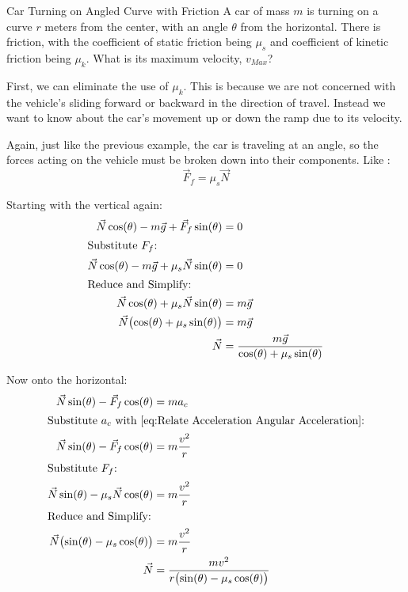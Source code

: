 \begin{example}[]{Car Turning on Angled Curve with Friction}
  A car of mass $m$ is turning on a curve $r$ meters from the center, with an angle $\theta$ from the horizontal.
  There is friction, with the coefficient of static friction being $\mu_{s}$ and coefficient of kinetic friction being $\mu_{k}$.
  What is its maximum velocity, $v_{Max}$?
  \tcblower{}

  First, we can eliminate the use of $\mu_{k}$.
  This is because we are not concerned with the vehicle's sliding forward or backward in the direction of travel.
  Instead we want to know about the car's movement up or down the ramp due to its velocity.

  Again, just like the previous example, the car is traveling at an angle, so the forces acting on the vehicle must be broken down into their components.
  Like :
  \begin{equation*}
    \vec{F}_{f} = \mu_{s} \vec{N}
  \end{equation*}

  Starting with the vertical again:
  \begin{align*}
    \vec{N} \cos(\theta) - m\vec{g} + \vec{F}_{f} \sin(\theta) &= 0 \\
    \shortintertext{Substitute $F_{f}$:}
    \vec{N} \cos(\theta) - m\vec{g} + \mu_{s} \vec{N} \sin(\theta) &= 0 \\
    \shortintertext{Reduce and Simplify:}
    \vec{N} \cos(\theta) + \mu_{s} \vec{N} \sin(\theta) &= m \vec{g} \\
    \vec{N} \bigl( \cos(\theta) + \mu_{s} \sin(\theta) \bigr) &= m \vec{g} \\
    \vec{N} &= \frac{m \vec{g}}{\cos(\theta) + \mu_{s} \sin(\theta)} \\
  \end{align*}

  Now onto the horizontal:
  \begin{align*}
    \vec{N} \sin(\theta) - \vec{F}_{f} \cos(\theta) &= m a_{c} \\
    \intertext{Substitute $a_{c}$ with \Cref{eq:Relate Acceleration Angular Acceleration}:}
    \vec{N} \sin(\theta) - \vec{F}_{f} \cos(\theta) &= m \frac{v^{2}}{r} \\
    \shortintertext{Substitute $F_{f}$:}
    \vec{N} \sin(\theta) - \mu_{s} \vec{N} \cos(\theta) &= m \frac{v^{2}}{r} \\
    \shortintertext{Reduce and Simplify:}
    \vec{N} \bigl( \sin(\theta) - \mu_{s} \cos(\theta) \bigr) &= m \frac{v^{2}}{r} \\
    \vec{N} &= \frac{m v^{2}}{r \bigl( \sin(\theta) - \mu_{s} \cos(\theta) \bigr)} \\
  \end{align*}


\end{example}
